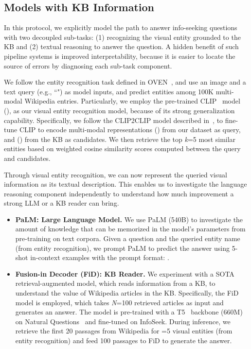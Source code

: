 \documentclass[11pt]{article}
\begin{document}
 
\subsection{Models with KB Information}
\label{subsec:pipeline_models}

In this protocol, we explicitly model the path to answer info-seeking questions with two decoupled sub-tasks: (1) recognizing the visual entity grounded to the KB and (2) textual reasoning to answer the question. A hidden benefit of such pipeline systems is improved interpretability, because it is easier to locate the source of errors by diagnosing each sub-task component.

We follow the entity recognition task defined in OVEN~\cite{hu2023opendomain}, and use an image and a text query (e.g., ``") as model inputs, and predict entities among 100K multi-modal Wikipedia entries.
Particularly, we employ the pre-trained CLIP~\cite{radford2021clip} model (), as our visual entity recognition model, because of its strong generalization capability.
Specifically, we follow the CLIP2CLIP model described in~\citeauthor{hu2023opendomain}, to fine-tune CLIP to encode multi-modal representations () from our dataset as query, and () from the KB as candidates.
We then retrieve the top \textit{k}=5 most similar entities based on weighted cosine similarity scores computed between the query and candidates. 

Through visual entity recognition, we can now represent the queried visual information as its textual description.
This enables us to investigate the language reasoning component independently to understand how much improvement a strong LLM or a KB reader can bring.

\begin{itemize}[leftmargin=*,topsep=0pt,itemsep=0pt]
    \item \textbf{PaLM: Large Language Model.}
    We use PaLM (540B) to investigate the amount of knowledge that can be memorized in the model's parameters from pre-training on text corpora.
    Given a question and the queried entity name (from entity recognition), we prompt PaLM to predict the answer using 5-shot in-context examples with the prompt format: .
    \item \textbf{Fusion-in Decoder (FiD): KB Reader.}
    We experiment with a SOTA retrieval-augmented model, which reads information from a KB, to understand the value of Wikipedia articles in the KB.
    Specifically, the FiD~\cite{izacard2020fid} model is employed, which takes \textit{N}=100 retrieved articles as input and generates an answer. 
    The model is pre-trained with a T5~\cite{2020t5} backbone (660M) on Natural Questions~\cite{kwiatkowski-etal-2019-natural} and fine-tuned on {\sc InfoSeek}. 
    During inference, we retrieve the first 20 passages from Wikipedia for =5 visual entities (from entity recognition) and feed 100 passages to FiD to generate the answer. 
\end{itemize}
 
\end{document}
